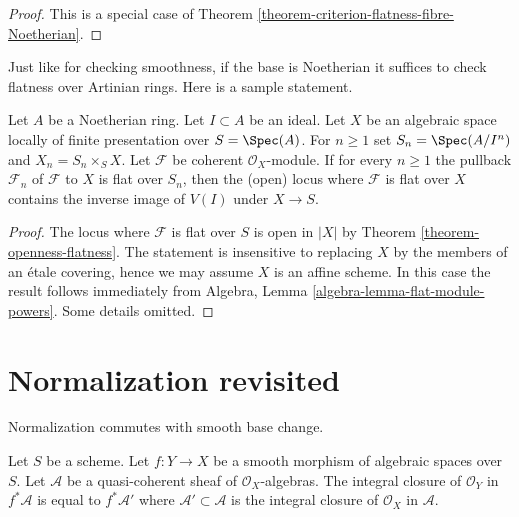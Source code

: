 \begin{proof}
This is a special case of
Theorem \ref{theorem-criterion-flatness-fibre-Noetherian}.
\end{proof}

\noindent
Just like for checking smoothness, if the base is Noetherian it suffices
to check flatness over Artinian rings. Here is a sample statement.

\begin{lemma}
\label{lemma-flatness-over-Noetherian-ring}
Let $A$ be a Noetherian ring. Let $I \subset A$ be an ideal.
Let $X$ be an algebraic space locally of finite presentation over
$S = \Spec(A)$. For $n \geq 1$ set $S_n = \Spec(A/I^n)$ and
$X_n = S_n \times_S X$. Let $\mathcal{F}$ be coherent $\mathcal{O}_X$-module.
If for every $n \geq 1$ the pullback $\mathcal{F}_n$ of $\mathcal{F}$ to $X$
is flat over $S_n$, then the (open) locus where $\mathcal{F}$
is flat over $X$ contains the inverse image of $V(I)$ under $X \to S$.
\end{lemma}

\begin{proof}
The locus where $\mathcal{F}$ is flat over $S$ is open in $|X|$ by
Theorem \ref{theorem-openness-flatness}.
The statement is insensitive to replacing $X$ by the members of an
\'etale covering, hence we may assume $X$ is an affine scheme.
In this case the result follows immediately from
Algebra, Lemma \ref{algebra-lemma-flat-module-powers}.
Some details omitted.
\end{proof}







\section{Normalization revisited}
\label{section-normalization}

\noindent
Normalization commutes with smooth base change.

\begin{lemma}
\label{lemma-integral-closure-smooth-pullback}
Let $S$ be a scheme. Let $f : Y \to X$ be a smooth morphism of
algebraic spaces over $S$. Let $\mathcal{A}$ be a quasi-coherent
sheaf of $\mathcal{O}_X$-algebras. The integral closure
of $\mathcal{O}_Y$ in $f^*\mathcal{A}$ is equal to $f^*\mathcal{A}'$
where $\mathcal{A}' \subset \mathcal{A}$ is the integral closure of
$\mathcal{O}_X$ in $\mathcal{A}$.
\end{lemma}

